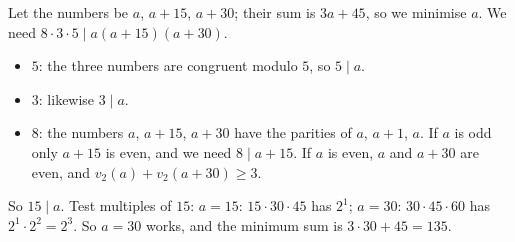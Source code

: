 Let the numbers be $a$, $a+15$, $a+30$; their sum is $3a+45$, so we minimise $a$. We need $8\cdot3\cdot5\mid a(a+15)(a+30)$.
\begin{itemize}
\item $5$: the three numbers are congruent modulo $5$, so $5\mid a$.
\item $3$: likewise $3\mid a$.
\item $8$: the numbers $a$, $a+15$, $a+30$ have the parities of $a$, $a+1$, $a$. If $a$ is odd only $a+15$ is even, and we need $8\mid a+15$. If $a$ is even, $a$ and $a+30$ are even, and $v_2(a)+v_2(a+30)\ge3$.
\end{itemize}
So $15\mid a$. Test multiples of $15$: $a=15$: $15\cdot30\cdot45$ has $2^1$; $a=30$: $30\cdot45\cdot60$ has $2^1\cdot2^2=2^3$. So $a=30$ works, and the minimum sum is $3\cdot30+45=\boxed{135}$.
